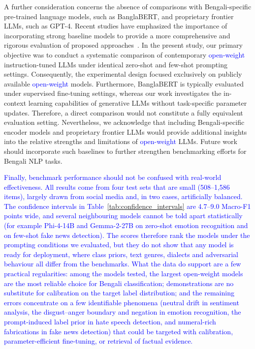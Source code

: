 \documentclass[10pt,letterpaper]{article}
\newcommand{\rev}[1]{\textcolor{blue}{#1}}
\begin{document}
A further consideration concerns the absence of comparisons with Bengali-specific pre-trained language models, such as BanglaBERT, and proprietary frontier LLMs, such as GPT-4. Recent studies have emphasized the importance of incorporating strong baseline models to provide a more comprehensive and rigorous evaluation of proposed approaches~\cite{b49,b50,b51,b52,b53}. In the present study, our primary objective was to conduct a systematic comparison of contemporary \rev{open-weight} instruction-tuned LLMs under identical zero-shot and few-shot prompting settings. Consequently, the experimental design focused exclusively on publicly available \rev{open-weight} models. Furthermore, BanglaBERT is typically evaluated under supervised fine-tuning settings, whereas our work investigates the in-context learning capabilities of generative LLMs without task-specific parameter updates. Therefore, a direct comparison would not constitute a fully equivalent evaluation setting. Nevertheless, we acknowledge that including Bengali-specific encoder models and proprietary frontier LLMs would provide additional insights into the relative strengths and limitations of \rev{open-weight} LLMs. Future work should incorporate such baselines to further strengthen benchmarking efforts for Bengali NLP tasks.


\rev{Finally, benchmark performance should not be confused with real-world effectiveness. All results come from four test sets that are small (508--1,586 items), largely drawn from social media and, in two cases, artificially balanced. The confidence intervals in Table~\ref{tab:confidence_intervals} are 4.7--9.0 Macro-F1 points wide, and several neighbouring models cannot be told apart statistically (for example Phi-4-14B and Gemma-2-27B on zero-shot emotion recognition and on few-shot fake news detection). The scores therefore rank the models under the prompting conditions we evaluated, but they do not show that any model is ready for deployment, where class priors, text genres, dialects and adversarial behaviour all differ from the benchmarks. What the data do support are a few practical regularities: among the models tested, the largest open-weight models are the most reliable choice for Bengali classification; demonstrations are no substitute for calibration on the target label distribution; and the remaining errors concentrate on a few identifiable phenomena (neutral drift in sentiment analysis, the disgust--anger boundary and negation in emotion recognition, the prompt-induced label prior in hate speech detection, and numeral-rich fabrications in fake news detection) that could be targeted with calibration, parameter-efficient fine-tuning, or retrieval of factual evidence.}
\end{document}
